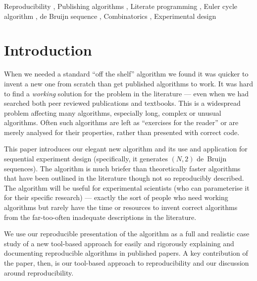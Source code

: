 \documentclass[preprint,times]{elsarticle}
\def\newstart{\color{red}}
\def\newstart{}
\begin{document}
\begin{keyword}
Reproducibility \sep
Publishing algorithms \sep
Literate programming \sep
Euler cycle algorithm \sep
de Bruijn sequence \sep
Combinatorics \sep
Experimental design
\end{keyword}



\maketitle

\section{Introduction}
When we needed a standard ``off the shelf'' algorithm we found it was quicker to invent a new one from scratch than get published algorithms to work. It was hard to find a \emph{working\/} solution for the problem in the literature --- even when we had searched both peer reviewed publications and textbooks. This is a widespread problem affecting many algorithms, especially long, complex or unusual algorithms. Often such algorithms are left as ``exercises for the reader'' or are merely analysed for their properties, rather than presented with correct code.

This paper introduces our elegant new algorithm and its use and application for sequential experiment design (specifically, it generates $(N,2)$ de~Bruijn sequences). \newstart The algorithm is much briefer than theoretically faster algorithms that have been outlined in the literature though not so reproducibly described. The algorithm will be useful for experimental scientists (who can parameterise it for their specific research) --- exactly the sort of people who need working algorithms but rarely have the time or resources to invent correct algorithms from the far-too-often inadequate descriptions in the literature.

We use our reproducible presentation of the algorithm as a full and realistic case study of a new tool-based approach for easily and rigorously explaining and documenting reproducible algorithms in published papers. A key contribution of the paper, then, is our tool-based approach to reproducibility and our discussion around reproducibility.
\end{document}
